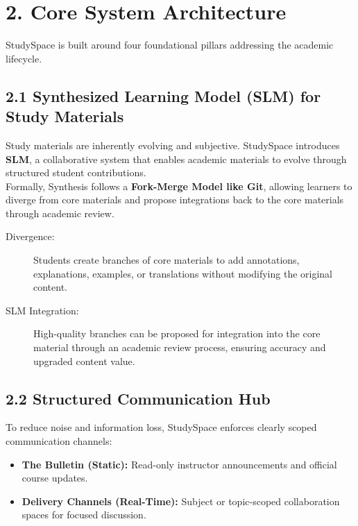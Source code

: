 \documentclass[11pt, a4paper]{article}
\begin{document}
\section{2. Core System Architecture}
StudySpace is built around four foundational pillars addressing the academic lifecycle.

\subsection{2.1 Synthesized Learning Model (SLM) for Study Materials}
Study materials are inherently evolving and subjective. StudySpace introduces \textbf{SLM}, a collaborative system that enables academic materials to evolve through structured student contributions.\\ Formally, Synthesis follows a \textbf{Fork-Merge Model like Git}, allowing learners to diverge from core materials and propose integrations back to the core materials through academic review.

\begin{description}
    \item[Divergence:] Students create branches of core materials to add annotations, explanations, examples, or translations without modifying the original content.
    \item[SLM Integration:] High-quality branches can be proposed for integration into the core material through an academic review process, ensuring accuracy and upgraded content value.
\end{description}

\subsection{2.2 Structured Communication Hub}
To reduce noise and information loss, StudySpace enforces clearly scoped communication channels:

\begin{itemize}
    \item \textbf{The Bulletin (Static):} Read-only instructor announcements and official course updates.
    \item \textbf{Delivery Channels (Real-Time):} Subject or topic-scoped collaboration spaces for focused discussion.
\end{itemize}
\end{document}
